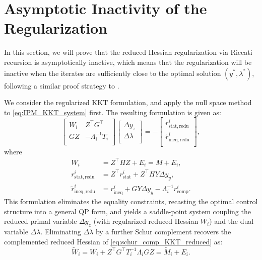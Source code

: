 \documentclass[class=scrbook, crop=false]{standalone}
\begin{document}
\section{Asymptotic Inactivity of the Regularization}
\label{sec:asymptotic_inactivity}
In this section,
we will prove that the reduced Hessian regularization via Riccati recursion is asymptotically inactive,
which means that the regularization will be inactive when the iterates are sufficiently close to the optimal solution $(y^*, \lambda^*)$,
following a similar proof strategy to \cite{absilNewtonKKTInteriorpointMethods2007}.

We consider the regularized KKT formulation, and apply the null space method to \eqref{eq:IPM_KKT_system} first.
The resulting formulation is given as:
\begin{equation}
    \begin{bmatrix}
    W_i & Z^\top G^\top\\
    GZ & -\Lambda_i^{-1}T_i\\
    \end{bmatrix}
    \begin{bmatrix}
    \Delta y_z \\
    \Delta \lambda \\
    \end{bmatrix} = -
    \begin{bmatrix}
    r_{\mathrm{stat, redu}}^i \\
    \tilde{r}_{\mathrm{ineq, redu}}^i \\
    \end{bmatrix},
    \label{eq:reduced_KKT_system_schur}
\end{equation}
where
\begin{align*}
    W_i &= Z^\top H Z + E_i = M + E_i, \\
    r_{\mathrm{stat, redu}}^i &= Z^\top r_{\mathrm{stat}}^i + Z^\top H Y \Delta y_y, \\
    \tilde{r}_{\mathrm{ineq, redu}}^i &=  r_{\mathrm{ineq}}^i + G Y \Delta y_y - \Lambda_i^{-1}r_{\mathrm{comp}}^i.
\end{align*}
This formulation eliminates the equality constraints, recasting the optimal control structure into a general QP form, 
and yields a saddle-point system coupling the reduced primal variable $\Delta y_z$ (with regularized reduced Hessian $W_i$) and the dual variable $\Delta\lambda$.
Eliminating $\Delta\lambda$ by a further Schur complement recovers the complemented reduced Hessian of \eqref{eq:schur_comp_KKT_reduced} as:
\begin{equation*}
    \tilde{W}_i = W_i + Z^\top G^\top T_i^{-1}\Lambda_i G Z = \tilde{M}_i + E_i.
\end{equation*}
\end{document}
